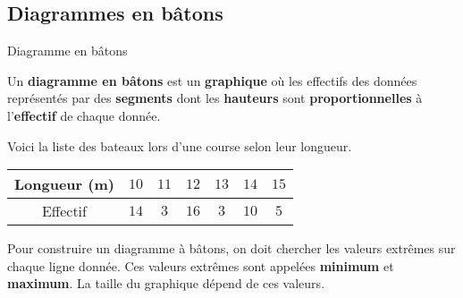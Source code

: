 \begin{pageCours} 
 
 
\section{Diagrammes en bâtons}

\begin{DefT}{Diagramme en bâtons}

Un \textbf{diagramme en bâtons} est un \textbf{graphique} où les effectifs des données représentés par des \textbf{segments} dont les \textbf{hauteurs} sont \textbf{proportionnelles} à l'\textbf{effectif} de chaque donnée.
\end{DefT}

\begin{Ex}

Voici la liste des bateaux lors d'une course selon leur longueur.
\begin{center}

\begin{tabular}{|c|c|c|c|c|c|c|}\hline
Longueur (m) & $10$ & $11$ & $12$ & $13$ & $14$ & $15$ \\\hline
Effectif & $14$ & $3$ & $16$ & $3$ & $10$ & $5$ \\\hline
\end{tabular}

\end{center}
\end{Ex}

\begin{Mt} 

Pour construire un diagramme à bâtons, on doit chercher les valeurs  extrêmes sur chaque ligne donnée. Ces  valeurs  extrêmes sont appelées \textbf{minimum} et \textbf{maximum}. La taille du graphique dépend de ces valeurs.

\end{Mt}

\end{pageCours}

